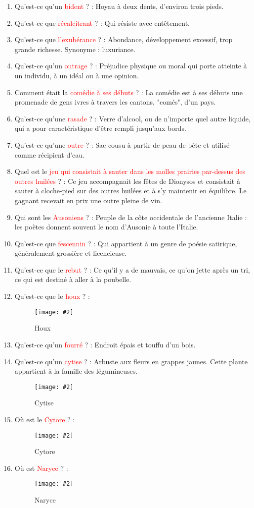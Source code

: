 \documentclass[a4paper, 11pt, hidelinks]{article}
\newcommand{\img}[4]{\begin{figure}[!ht]
    \centering
    \texttt{[image: \#2]}
    \caption{#3}
    \label{#4}
    \end{figure} }
\begin{document}
\begin{enumerate}
            \item Qu'est-ce qu'un \textcolor{red}{bident} ? : Hoyau à deux dents, d'environ trois pieds.
            \item Qu'est-ce que \textcolor{red}{récalcitrant} ? : Qui résiste avec entêtement.
            \item Qu'est-ce que \textcolor{red}{l'exubérance} ? : Abondance, développement excessif, trop grande richesse. Synonyme : luxuriance.
            \item Qu'est-ce qu'un \textcolor{red}{outrage} ? : Préjudice physique ou moral qui porte atteinte à un individu, à un idéal ou à une opinion.
            \item Comment était la \textcolor{red}{comédie à ses débuts} ? : La comédie est à ses débuts une promenade de gens ivres à travers les cantons, "comés", d'un pays.
            \item Qu'est-ce qu'une \textcolor{red}{rasade} ? : Verre d'alcool, ou de n'importe quel autre liquide, qui a pour caractéristique d'être rempli jusqu'aux bords.
            \item Qu'est-ce qu'une \textcolor{red}{outre} ? : Sac cousu à partir de peau de bête et utilisé comme récipient d'eau.
            \item Quel est le \textcolor{red}{jeu qui consistait à sauter dans les molles prairies par-dessus des outres huilées} ? : Ce jeu accompagnait les fêtes de
                  Dionysos et consistait à sauter à cloche-pied sur des outres huilées et à s'y maintenir en équilibre. Le gagnant recevait en prix une outre pleine de vin.
            \item Qui sont les \textcolor{red}{Ausoniens} ? : Peuple de la côte occidentale de l'ancienne Italie : les poètes donnent souvent le nom
                  d'Ausonie à toute l'Italie.
            \item Qu'est-ce que \textcolor{red}{fescennin} ? : Qui appartient à un genre de poésie satirique, généralement grossière et licencieuse.
            \item Qu'est-ce que le \textcolor{red}{rebut} ? : Ce qu'il y a de mauvais, ce qu'on jette après un tri, ce qui est destiné à aller à la poubelle.
            \item Qu'est-ce que le \textcolor{red}{houx} ? :
                  \img{0.5}{Houx.jpg}{Houx}{94}
                  \item Qu'est-ce qu'un \textcolor{red}{fourré} ? : Endroit épais et touffu d'un bois.
                  \item Qu'est-ce qu'un \textcolor{red}{cytise} ? : Arbuste aux fleurs en grappes jaunes. Cette plante appartient à la famille des légumineuses.
                        \img{0.5}{Cytise.jpg}{Cytise}{95}
                  \item Où est le \textcolor{red}{Cytore} ? :
                        \img{0.3}{Cytore.png}{Cytore}{96}
                        \item Où est \textcolor{red}{Naryce} ? : 
                        \img{0.3}{Naryce.png}{Naryce}{98}
                                                                              
\end{enumerate}
\end{document}

